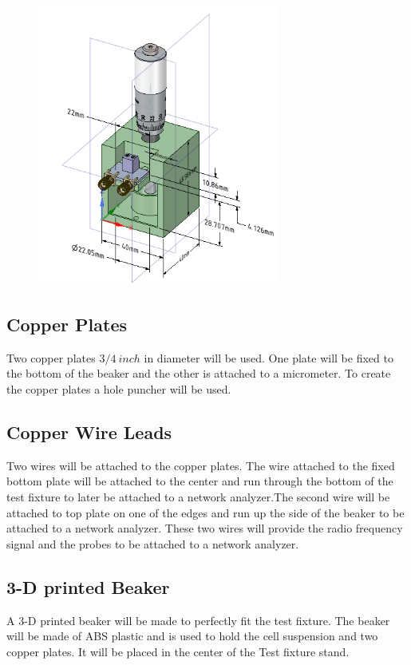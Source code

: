 \documentclass[journal]{IEEEtran}
\begin{document}
\begin{figure}[h]
\label{test-fixture}
\includegraphics[width=8cm]{Combined_Test_Fixture.png}
\end{figure}

\subsection{Copper Plates}
Two copper plates $3/4 \: inch$ in diameter will be used. One plate will be fixed to the bottom of the beaker and the other is attached to a micrometer. To create the copper plates a hole puncher will be used.

\subsection{Copper Wire Leads}
Two wires will be attached to the copper plates. The wire attached to the fixed bottom plate will be attached to the center and run through the bottom of the test fixture to later be attached to a network analyzer.The second wire will be attached to top plate on one of the edges and run up the side of the beaker to be attached to a network analyzer. These two wires will provide the radio frequency signal and the probes to be attached to a network analyzer.

\subsection{3-D printed Beaker}
A 3-D printed beaker will be made to perfectly fit the test fixture. The beaker will be made of ABS plastic and is used to hold the cell suspension and two copper plates. It will be placed in the center of the Test fixture stand.
\end{document}

